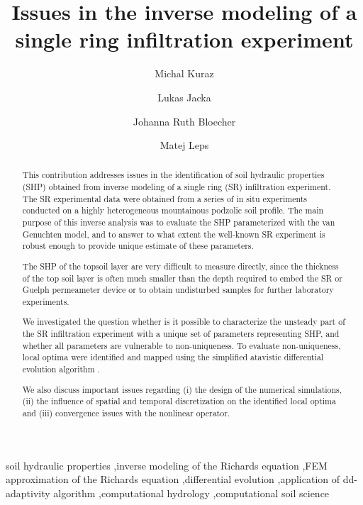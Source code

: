 \documentclass[review]{elsarticle}
\begin{document}
\begin{frontmatter}

\title{Issues in the inverse modeling of a single ring infiltration experiment}

\author[autor1]{Michal Kuraz}

\author[autor1]{Lukas Jacka}

\author[autor1]{Johanna Ruth Bloecher}

\author[autor2]{Matej Leps}



\address[autor1]{Czech University of Life Sciences Prague, Faculty of Environmental Sciences, Department of Water Resources and Environmental Modeling}

\address[autor2]{Czech Technical University in Prague, Faculty of Civil Engineering, Department of Mechanics}

\begin{abstract}
This contribution addresses issues in the identification of soil hydraulic properties (SHP) obtained from inverse modeling of a single ring (SR) infiltration experiment. 
The SR experimental  data  were obtained from a series of in situ experiments conducted on a highly heterogeneous mountainous podzolic soil profile. 
The main purpose of this inverse analysis was to evaluate the SHP parameterized with the van Genuchten model, and to answer to what extent the well-known SR experiment is robust enough to provide unique estimate of these parameters.

The SHP of the topsoil layer are very difficult to measure directly, since the thickness of the top soil layer is often much smaller than the depth required to embed the SR or Guelph permeameter device or to obtain undisturbed samples for further laboratory experiments.


We investigated the question whether is it possible to characterize the unsteady part of the SR infiltration experiment with a unique set of parameters representing  SHP, and whether all parameters are vulnerable to non-uniqueness. To evaluate non-uniqueness, local optima were identified and mapped using the simplified atavistic differential evolution algorithm \citep{Hrstka,grade}.   

We also discuss important issues regarding (i) the design of the numerical simulations, (ii) the influence of spatial and temporal discretization on the identified local optima and (iii) convergence issues with the nonlinear operator. 
\end{abstract}

\begin{keyword}
soil hydraulic properties \sep inverse modeling of the Richards equation \sep FEM approximation of the Richards equation \sep differential evolution \sep application of dd-adaptivity algorithm \sep computational hydrology \sep computational soil science


\end{keyword}

\end{frontmatter}
\end{document}
